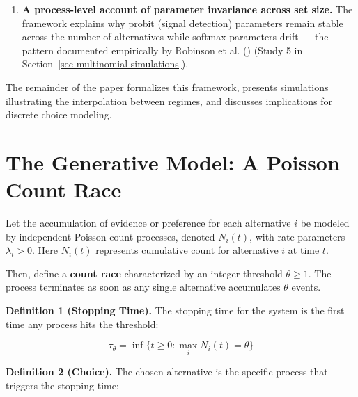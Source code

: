 \documentclass[
  man,
  floatsintext,
  longtable,
  a4paper,
  nolmodern,
  notxfonts,
  notimes,
  colorlinks=true,linkcolor=blue,citecolor=blue,urlcolor=blue]{apa7}
\begin{document}
\begin{enumerate}
  against others --- recovers in the high-threshold limit \emph{every}
  choice-relevant probit covariance, including negative dependence
  (Result 5, Section~\ref{sec-inhibitory-race}). Whereas existing
  dependent-race models
  ()
  generate dependence only through common shocks, and are thereby
  confined to a restricted class of non-negative covariances, the signed
  construction spans the full choice-relevant class. The generality
  comes at the cost of the count-process representation, and the
  mechanism still carries a finite-threshold bound, analogous to
  \(\rho_{\max}\), coupling expressible utility contrasts to available
  noise.
\item
  \textbf{A process-level account of parameter invariance across set
  size.} The framework explains why probit (signal detection) parameters
  remain stable across the number of alternatives while softmax
  parameters drift --- the pattern documented empirically by Robinson et
  al. () (Study 5 in
  Section~\ref{sec-multinomial-simulations}).
\end{enumerate}

The remainder of the paper formalizes this framework, presents
simulations illustrating the interpolation between regimes, and
discusses implications for discrete choice modeling.

\section{The Generative Model: A Poisson Count
Race}\label{sec-generative-model}

Let the accumulation of evidence or preference for each alternative
\(i\) be modeled by independent Poisson count processes, denoted
\(N_i(t)\), with rate parameters \(\lambda_i > 0\). Here \(N_i(t)\)
represents cumulative count for alternative \(i\) at time \(t\).

Then, define a \textbf{count race} characterized by an integer threshold
\(\theta \ge 1\). The process terminates as soon as any single
alternative accumulates \(\theta\) events.

\textbf{Definition 1 (Stopping Time).} The stopping time for the system
is the first time any process hits the threshold:

\[
\tau_{\theta} = \inf \{t \ge 0 : \max_{i} N_i(t) = \theta \}
\]

\textbf{Definition 2 (Choice).} The chosen alternative is the specific
process that triggers the stopping time:
\end{document}
